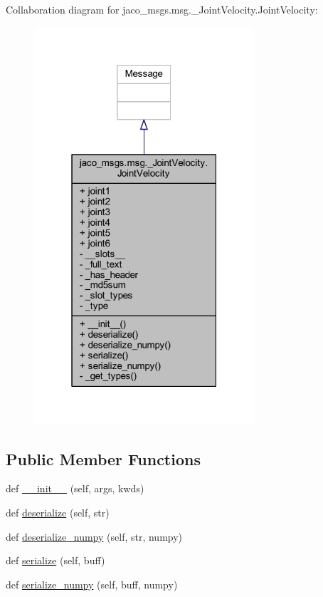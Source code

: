 Collaboration diagram for jaco\+\_\+msgs.\+msg.\+\_\+\+Joint\+Velocity.\+Joint\+Velocity\+:
\nopagebreak
\begin{figure}[H]
\begin{center}
\leavevmode
\includegraphics[width=232pt]{d7/d2d/classjaco__msgs_1_1msg_1_1__JointVelocity_1_1JointVelocity__coll__graph}
\end{center}
\end{figure}
\subsection*{Public Member Functions}
\begin{DoxyCompactItemize}
\item 
def \hyperlink{classjaco__msgs_1_1msg_1_1__JointVelocity_1_1JointVelocity_a65588ef7e4f925136edc6ce9ad147ab0}{\+\_\+\+\_\+init\+\_\+\+\_\+} (self, args, kwds)
\item 
def \hyperlink{classjaco__msgs_1_1msg_1_1__JointVelocity_1_1JointVelocity_a94380e9e77acc374ad4b1ed21c0f977c}{deserialize} (self, str)
\item 
def \hyperlink{classjaco__msgs_1_1msg_1_1__JointVelocity_1_1JointVelocity_a6bddb797a5bd910def8058e19dc64d4c}{deserialize\+\_\+numpy} (self, str, numpy)
\item 
def \hyperlink{classjaco__msgs_1_1msg_1_1__JointVelocity_1_1JointVelocity_add43994faae032a8c73267655c61946b}{serialize} (self, buff)
\item 
def \hyperlink{classjaco__msgs_1_1msg_1_1__JointVelocity_1_1JointVelocity_a05d9e9213327b34ab7925ce2b437c0f4}{serialize\+\_\+numpy} (self, buff, numpy)
\end{DoxyCompactItemize}
